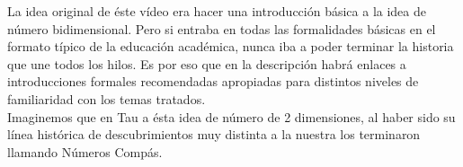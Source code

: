 \documentclass[preview]{standalone}
\begin{document}
\begin{center}
La idea original de éste vídeo era hacer una introducción básica a la idea de número bidimensional. Pero si entraba en todas las formalidades básicas en el formato típico  de la educación académica, nunca iba a poder terminar la historia que une todos los hilos. Es por eso que en la descripción habrá enlaces a introducciones formales recomendadas apropiadas para distintos niveles de familiaridad con los temas tratados. 
$$ $$ 
Imaginemos que en Tau a ésta idea de número de 2 dimensiones, al haber sido su línea histórica de descubrimientos muy distinta a la nuestra los terminaron llamando Números Compás.
\end{center}
\end{document}
